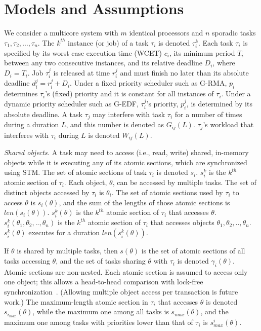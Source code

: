 \chapter{\label{models_assmuptions}Models and Assumptions}

We consider a multicore system with $m$ identical processors and $n$ sporadic tasks $\tau_1, \tau_2,\ldots, \tau_n$. The $k^{th}$ instance (or job) of a task $\tau_i$ is denoted $\tau_i^k$. Each task $\tau_i$ is specified by its worst case execution time (WCET) $c_i$, its minimum period $T_i$ between any two consecutive instances, and its relative deadline $D_i$, where $D_i=T_i$. Job $\tau_i^j$ is released at time $r_i^j$ and must finish no later than its absolute deadline $d_i^j=r_i^j+D_i$. Under a fixed priority scheduler such as G-RMA, $p_i$ determines $\tau_i$'s (fixed) priority and it is constant for all instances of $\tau_i$. Under a dynamic priority scheduler such as G-EDF, $\tau_i^j$'s priority, $p_i^j$, is determined by its absolute deadline. 
A task $\tau_j$ may interfere with task $\tau_i$ for a number of times during a duration $L$, and this number is denoted as $G_{ij}(L)$. 
$\tau_j$'s workload that interferes with $\tau_i$ during $L$ is denoted $W_{ij}(L)$.

\textit{Shared objects.} A task may need to access (i.e., read, write) shared, in-memory objects while it is executing any of its atomic sections, which are synchronized using STM. 
The set of atomic sections of task $\tau_i$ is denoted $s_i$. $s_i^k$ is the $k^{th}$ atomic section of $\tau_i$. 
Each object, $\theta$, can be accessed by multiple tasks. The set of distinct objects accessed by $\tau_i$ is $\theta_i$. The set of atomic sections used by $\tau_i$ to access $\theta$ is $s_i(\theta)$, and the sum of the lengths of those atomic sections is $len(s_i(\theta))$. $s_i^k(\theta)$ is the $k^{th}$ atomic section of $\tau_i$ that accesses $\theta$. $s_i^k(\theta_1,\theta_2, .. ,\theta_n)$ is the $k^{th}$ atomic section of $\tau_i$ that accesses objects $\theta_1,\theta_2, .. ,\theta_n$. $s_i^k(\theta)$  executes for a duration $len(s_i^k(\theta))$.

If $\theta$ is shared by multiple tasks, then $s(\theta)$ is the set of atomic sections of all tasks accessing $\theta$, and the set of tasks sharing $\theta$ with $\tau_i$ is denoted $\gamma_i(\theta)$. Atomic sections are non-nested. Each atomic section is assumed to access only one object; this allows a head-to-head comparison with lock-free synchronization~\cite{key-5}.  (Allowing multiple object access per transaction is future work.) The maximum-length atomic section in $\tau_i$ that accesses $\theta$ is denoted $s_{i_{max}} (\theta)$, while the maximum one among all tasks is $s_{max} (\theta)$, and the maximum one among tasks with priorities lower than that of $\tau_i$ is $s_{max}^i (\theta)$.

